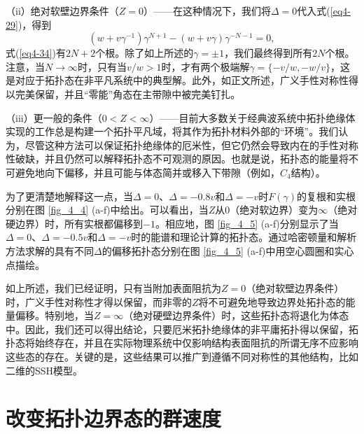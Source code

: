 （ii）绝对软壁边界条件（\(Z = 0\)）——在这种情况下，我们将\(\Delta = 0\)代入式(\ref{eq4-29})，得到
\begin{equation}\label{eq4-34}
(w + v\gamma^{-1})\gamma^{N + 1}-(w + v\gamma)\gamma^{-N - 1}=0,
\end{equation}
式(\ref{eq4-34})有\(2N + 2\)个根。除了如上所述的\(\gamma=\pm1\)，我们最终得到所有\(2N\)个根。注意，当\(N\rightarrow\infty\)时，只有当\(v/w > 1\)时，才有两个极端解\(\gamma = \{-v/w, -w/v\}\)，这是对应于拓扑态在非平凡系统中的典型解。此外，如正文所述，广义手性对称性得以完美保留，并且“零能”角态在主带隙中被完美钉扎。

（iii）更一般的条件（\(0 < Z < \infty\)）——目前大多数关于经典波系统中拓扑绝缘体实现的工作总是构建一个拓扑平凡域，将其作为拓扑材料外部的“环境”。我们认为，尽管这种方法可以保证拓扑绝缘体的厄米性，但它仍然会导致内在的手性对称性破缺，并且仍然可以解释拓扑态不可观测的原因。也就是说，拓扑态的能量将不可避免地向下偏移，并且可能与体态简并或移入下带隙（例如，\(C_{4}\)结构）。

为了更清楚地解释这一点，当\(\Delta = 0\)、\(\Delta = -0.8v\)和\(\Delta = -v\)时\(F(\gamma)\)的复根和实根分别在图 \ref{fig_4_4} (a-f)中给出。可以看出，当\(Z\)从\(0\)（绝对软边界）变为\(\infty\)（绝对硬边界）时，所有实根都偏移到\(-1\)。相应地，图 \ref{fig_4_5} (a-f)分别显示了当\(\Delta = 0\)、\(\Delta = -0.5v\)和\(\Delta = -v\)时的能谱和理论计算的拓扑态。通过哈密顿量和解析方法求解的具有不同\(\Delta\)的偏移拓扑态分别在图 \ref{fig_4_5} (a-f)中用空心圆圈和实心点描绘。

如上所述，我们已经证明，只有当附加表面阻抗为\(Z = 0\)（绝对软壁边界条件）时，广义手性对称性才得以保留，而非零的\(Z\)将不可避免地导致边界处拓扑态的能量偏移。特别地，当\(Z = \infty\)（绝对硬壁边界条件）时，这些拓扑态将退化为体态中。因此，我们还可以得出结论，只要厄米拓扑绝缘体的非平庸拓扑得以保留，拓扑态将始终存在，并且在实际物理系统中仅影响结构表面阻抗的所谓无序不应影响这些态的存在。关键的是，这些结果可以推广到遵循不同对称性的其他结构，比如二维的SSH模型。

\section{改变拓扑边界态的群速度}

